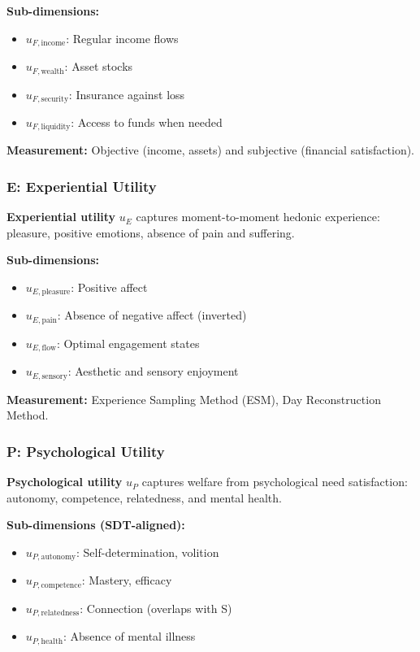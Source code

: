 \textbf{Sub-dimensions:}
\begin{itemize}[nosep]
\item $u_{F,\text{income}}$: Regular income flows
\item $u_{F,\text{wealth}}$: Asset stocks
\item $u_{F,\text{security}}$: Insurance against loss
\item $u_{F,\text{liquidity}}$: Access to funds when needed
\end{itemize}

\textbf{Measurement:} Objective (income, assets) and subjective (financial satisfaction).

\subsubsection{E: Experiential Utility}

\begin{definition}
\textbf{Experiential utility} $u_E$ captures moment-to-moment hedonic experience:
pleasure, positive emotions, absence of pain and suffering.
\end{definition}

\textbf{Sub-dimensions:}
\begin{itemize}[nosep]
\item $u_{E,\text{pleasure}}$: Positive affect
\item $u_{E,\text{pain}}$: Absence of negative affect (inverted)
\item $u_{E,\text{flow}}$: Optimal engagement states
\item $u_{E,\text{sensory}}$: Aesthetic and sensory enjoyment
\end{itemize}

\textbf{Measurement:} Experience Sampling Method (ESM), Day Reconstruction Method.

\subsubsection{P: Psychological Utility}

\begin{definition}
\textbf{Psychological utility} $u_P$ captures welfare from psychological need
satisfaction: autonomy, competence, relatedness, and mental health.
\end{definition}

\textbf{Sub-dimensions (SDT-aligned):}
\begin{itemize}[nosep]
\item $u_{P,\text{autonomy}}$: Self-determination, volition
\item $u_{P,\text{competence}}$: Mastery, efficacy
\item $u_{P,\text{relatedness}}$: Connection (overlaps with S)
\item $u_{P,\text{health}}$: Absence of mental illness
\end{itemize}

